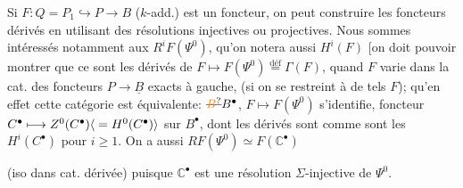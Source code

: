 Si $F:Q=P_1\hookrightarrow P\longrightarrow B$ ($k$-add.) est un foncteur, on peut construire les foncteurs dérivés  en utilisant des résolutions injectives ou projectives. Nous sommes intéressés notamment aux $R^iF(\Psi^0)$, qu'on notera aussi $H^i(F)$ [on doit pouvoir montrer que ce sont les dérivés  de $F\longmapsto F(\Psi^0)\overset{\mathrm{déf}}{=}\Gamma(F)$, quand $F$ varie dans la cat. des foncteurs  $P\longrightarrow \underline{B}$ \inserted{$\Sigma$-}exacts à gauche, (si on se restreint à de tels $F$); qu'en effet cette catégorie est équivalente:  $\deleted{\unsure{B}} B^{\bullet}$, $F\longmapsto F(\Psi^0)$ s'identifie,  foncteur $C^{\bullet}\longmapsto Z^0(C^{\bullet})\inserted{{}=H^0(C^{\bullet})}$ sur $B^{\bullet}$, dont les dérivés sont comme sont les $H^i(C^{\bullet})$ pour $i\geq1$. On a aussi $RF(\Psi^0)\simeq F(\mathbb{C}^{\bullet})$

(iso dans cat. dérivée) puisque $\mathbb{C}^{\bullet}$ est une résolution $\Sigma$-injective de $\Psi^0$.


